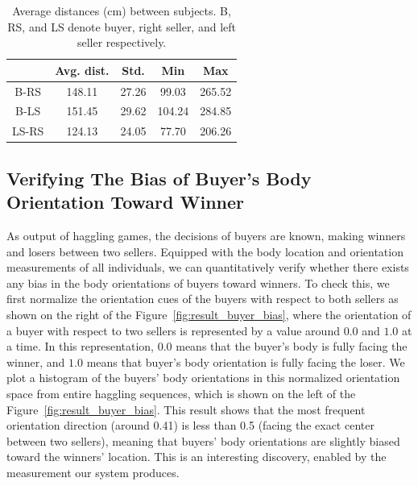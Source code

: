 \begin{table}[t]
	\centering
	\begin{tabular}{c| c| c| c| c}
		\hline
		& Avg. dist. & Std. & Min & Max \\
		\hline
		B-RS & 148.11 & 27.26 & 99.03 & 265.52 \\
		\hline
		B-LS & 151.45 & 29.62 & 104.24  & 284.85 \\
		\hline
		LS-RS & 124.13 & 24.05  & 77.70  & 206.26 \\
		\hline
	\end{tabular}
	\caption{Average distances (cm) between subjects. B, RS, and LS denote buyer, right seller, and left seller respectively.}
	\label{table:proxemics_comp}
\end{table}

\subsection{Verifying The Bias of Buyer's Body Orientation Toward Winner}
As output of haggling games, the decisions of buyers are known, making winners and losers between two sellers. Equipped with the body location and orientation measurements of all individuals, we can quantitatively verify whether there exists any bias in the body orientations of buyers toward winners. To check this, we first normalize the orientation cues of the buyers with respect to both sellers as shown on the right of the Figure~\ref{fig:result_buyer_bias}, where the orientation of a buyer with respect to two sellers is represented by a value around $0.0$ and $1.0$ at a time. In this representation, $0.0$ means that the buyer's body is fully facing the winner, and $1.0$ means that buyer's body orientation is fully facing the loser. We plot a histogram of the buyers' body orientations in this normalized orientation space from entire haggling sequences, which is shown on the left of the Figure~\ref{fig:result_buyer_bias}. This result shows that the most frequent orientation direction (around 0.41) is less than 0.5 (facing the exact center between two sellers), meaning that buyers' body orientations are slightly biased toward the winners' location. This is an interesting discovery, enabled by the measurement our system produces. 

